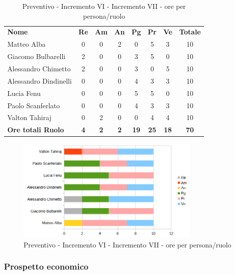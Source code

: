 \begin{table} [h!]
	\begin{center}
		\begin{tabular} { m{3.5cm} c c c c c c c }
			\rowcolor{lightgray}
			\textbf{Nome} & \textbf{Re} & \textbf{Am} & \textbf{An} & \textbf{Pg} & \textbf{Pr} & \textbf{Ve} & \textbf{Totale} \\
			Matteo Alba &0 &0 & 2& 0 &5 & 3 & 10 \\
			Giacomo Bulbarelli & 2&0 & 0& 3 & 5 & 0 & 10 \\
			Alessandro Chimetto & 2 & 0& 0& 3 & 0 & 5& 10 \\
			Alessandro Dindinelli & 0& 0 & 0& 4 & 3 &3 & 10 \\
			Lucia Fenu & 0 & 0 &0 & 5 & 5 & 0 & 10 \\
			Paolo Scanferlato &0 & 0 &0 & 4 & 3 & 3 & 10\\
			Valton Tahiraj & 0& 2 &0 & 0 & 4 & 4 & 10 \\
			\textbf{Ore totali Ruolo} & \textbf{4} & \textbf{2} & \textbf{2} & \textbf{19} & \textbf{25}& \textbf{18} & \textbf{70}
		\end{tabular}
		\caption{Preventivo - Incremento VI - Incremento VII - ore per persona/ruolo}
	\end{center}
\end{table}
\begin{figure} [h!]
	\centering
	\includegraphics[width=0.8\textwidth]{res/img/preventivi/6e7-barre.png}
	\caption{Preventivo - Incremento VI - Incremento VII - ore per persona/ruolo} 
\end{figure}

\newpage
\subsubsection{Prospetto economico}

